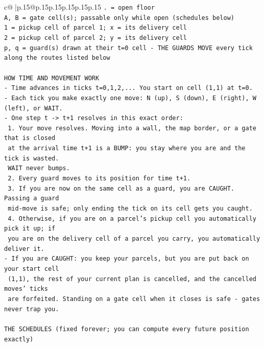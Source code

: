 \documentclass{article}
\begin{document}
{\begin{supertabular}{c@{$\;$}|p{.15\linewidth}@{}p{.15\linewidth}p{.15\linewidth}p{.15\linewidth}p{.15\linewidth}p{.15\linewidth}}
{{{\texttt{. = open floor} \\
\texttt{A, B = gate cell(s); passable only while open (schedules below)} \\
\texttt{1 = pickup cell of parcel 1; x = its delivery cell} \\
\texttt{2 = pickup cell of parcel 2; y = its delivery cell} \\
\texttt{p, q = guard(s) drawn at their t=0 cell {-} THE GUARDS MOVE every tick along the routes listed below} \\
\\ 
\texttt{HOW TIME AND MOVEMENT WORK} \\
\texttt{{-} Time advances in ticks t=0,1,2,... You start on cell (1,1) at t=0.} \\
\texttt{{-} Each tick you make exactly one move: N (up), S (down), E (right), W (left), or WAIT.} \\
\texttt{{-} One step t {-}> t+1 resolves in this exact order:} \\
\texttt{  1. Your move resolves. Moving into a wall, the map border, or a gate that is closed} \\
\texttt{     at the arrival time t+1 is a BUMP: you stay where you are and the tick is wasted.} \\
\texttt{     WAIT never bumps.} \\
\texttt{  2. Every guard moves to its position for time t+1.} \\
\texttt{  3. If you are now on the same cell as a guard, you are CAUGHT. Passing a guard} \\
\texttt{     mid{-}move is safe; only ending the tick on its cell gets you caught.} \\
\texttt{  4. Otherwise, if you are on a parcel's pickup cell you automatically pick it up; if} \\
\texttt{     you are on the delivery cell of a parcel you carry, you automatically deliver it.} \\
\texttt{{-} If you are CAUGHT: you keep your parcels, but you are put back on your start cell} \\
\texttt{  (1,1), the rest of your current plan is cancelled, and the cancelled moves' ticks} \\
\texttt{  are forfeited. Standing on a gate cell when it closes is safe {-} gates never trap you.} \\
\\ 
\texttt{THE SCHEDULES (fixed forever; you can compute every future position exactly)} \\
}}}
\end{supertabular}}
\end{document}
